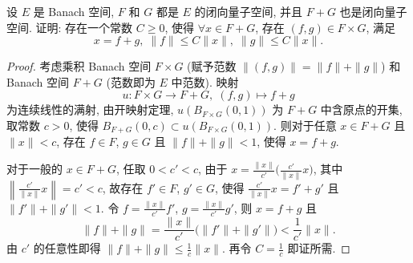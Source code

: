 

\setcounter{exer}{13}
\begin{exercise}
    设 $E$ 是 Banach 空间, $F$ 和 $G$ 都是 $E$ 的闭向量子空间, 并且 $F+G$
    也是闭向量子空间. 证明: 存在一个常数 $C\geq 0$, 使得 $\forall x\in F+G$,
    存在 $(f,g)\in F\times G$, 满足
    \[x=f+g,\;\|f\|\leq C\|x\|,\;\|g\|\leq C\|x\|.\]
\end{exercise}

\begin{proof}
    考虑乘积 Banach 空间 $F\times G$ (赋予范数 $\|(f,g)\|=\|f\|+\|g\|$)
    和 Banach 空间 $F+G$ (范数即为 $E$ 中范数). 映射
    \[u:F\times G\to F+G,\;(f,g)\mapsto f+g\]
    为连续线性的满射, 由开映射定理, $u(B_{F\times G}(0,1))$ 为 $F+G$ 中含原点的开集,
    取常数 $c>0$, 使得 $B_{F+G}(0,c)\subset u(B_{F\times G}(0,1))$.
    则对于任意 $x\in F+G$ 且 $\|x\|<c$, 存在 $f\in F$, $g\in G$
    且 $\|f\|+\|g\|<1$, 使得 $x=f+g$.

    对于一般的 $x\in F+G$, 任取 $0<c'<c$, 由于 $x=\frac{\|x\|}{c'}\bigl(\frac{c'}{\|x\|}x\bigr)$,
    其中 $\left\|\frac{c'}{\|x\|}x\right\|=c'<c$, 故存在 $f'\in F$, $g'\in G$,
    使得 $\frac{c'}{\|x\|}x=f'+g'$ 且 $\|f'\|+\|g'\|<1$.
    令 $f=\frac{\|x\|}{c'}f'$, $g=\frac{\|x\|}{c'}g'$, 则
    $x=f+g$ 且
    \[\|f\|+\|g\|=\frac{\|x\|}{c'}\bigl(\|f'\|+\|g'\|\bigr)<\frac{1}{c'}\|x\|.\]
    由 $c'$ 的任意性即得 $\|f\|+\|g\|\leq\frac{1}{c}\|x\|$.
    再令 $C=\frac{1}{c}$ 即证所需.
\end{proof}



